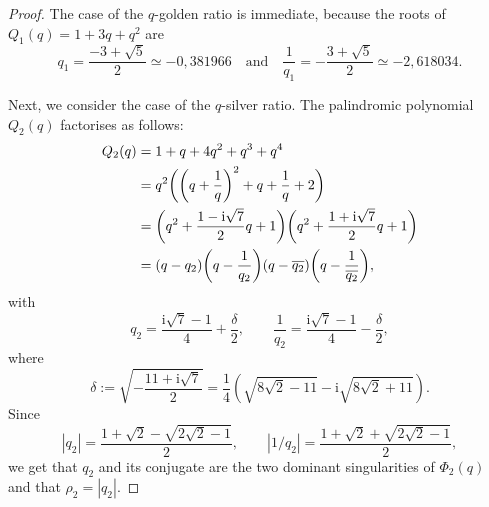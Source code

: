 \documentclass[11pt,reqno]{amsart}
\theoremstyle{plain}
\theoremstyle{definition}
\numberwithin{figure}{section}
\numberwithin{table}{section}
\numberwithin{equation}{section}
\newcommand\de{\delta}
\newcommand{\ov}[1]{\overline {#1}}
\newcommand\ip{\ensuremath{\mathrm{i}}}
\let\fr=\frac
\begin{document}
\begin{proof}
The case of the $q$-golden ratio is immediate, because the roots of $Q_1(q)=1+3q+q^2$ are
\begin{equation*}
q_1=\fr{-3+\sqrt{5}}2\simeq -0,381966\quad\text{and}\quad \fr 1{q_1}=-\fr{3+\sqrt{5}}2\simeq -2,618034.
\end{equation*} 

Next, we consider the case of the $q$-silver ratio. The palindromic polynomial $Q_2(q)$ factorises as follows:
\begin{align}
Q_2(q)&=1+q+4q^2+q^3+q^4\notag\\
&=q^2\biggl(\biggl(q+\fr 1{q}\biggr)^2+q+\fr 1{q}+2\biggr)\notag\\
&=\biggl(q^2+\fr{1-\ip\sqrt{7}}{2}q+1\biggr)\biggl(q^2+\fr{1+\ip\sqrt{7}}{2}q+1\biggr)\notag\\
&=(q-q_2)\biggl(q-\fr 1{q_2}\biggr)(q-\ov{ q_2})\biggl(q-\fr 1{\ov{q_2}}\biggr),\label{Q_2}
\end{align}
with
\begin{equation*}
q_2=\fr{\ip\sqrt{7}-1}{4}+\fr \de{2},\qquad 
\fr 1{q_2}=\fr{\ip\sqrt{7}-1}{4}-\fr \de{2},
\end{equation*}
where 
\begin{equation}\label{delta}
\de:=\sqrt{-\fr{11+\ip\sqrt{7}}{2}}=\fr 1{4}\left(\sqrt{8\sqrt{2}-11}-\ip\sqrt{8\sqrt{2}+11}\right).
\end{equation}
Since
\begin{equation*}
|q_2|=\fr{1+\sqrt{2}-\sqrt{2\sqrt{2}-1}}{2},\qquad 
|1/q_2|=\fr{1+\sqrt{2}+\sqrt{2\sqrt{2}-1}}{2},
\end{equation*}
we get that $q_2$ and its conjugate are the two dominant singularities of $\Phi_2(q)$ and that $\rho_2=|q_2|$.


\end{proof}
\end{document}
